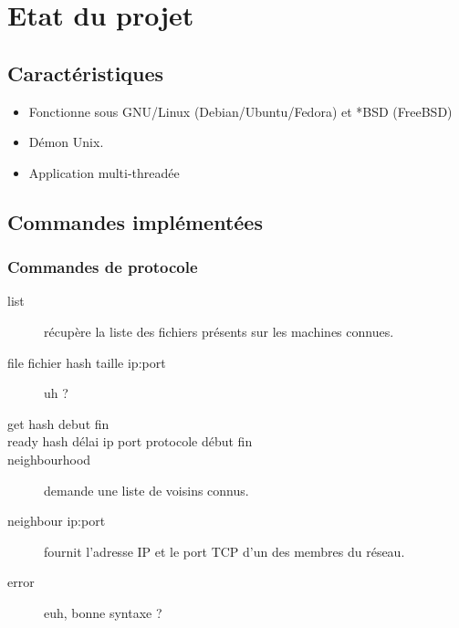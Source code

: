 \chapter{Etat du projet}

\section{Caractéristiques}
\begin{itemize}
    \item Fonctionne sous GNU/Linux (Debian/Ubuntu/Fedora) et *BSD (FreeBSD)
    \item Démon Unix.
    \item Application multi-threadée
\end{itemize}
\section{Commandes implémentées}

\subsection{Commandes de protocole}
\begin{description}
    \item[list] récupère la liste des fichiers présents sur les machines
connues.
    \item[file fichier hash taille ip:port] uh ?
    \item[get hash debut fin] 
    \item[ready hash délai ip port protocole début fin]
    \item[neighbourhood] demande une liste de voisins connus.
    \item[neighbour ip:port] fournit l'adresse IP et le port TCP d'un des
membres du réseau.
    \item[error] euh, bonne syntaxe ?
\end{description}



